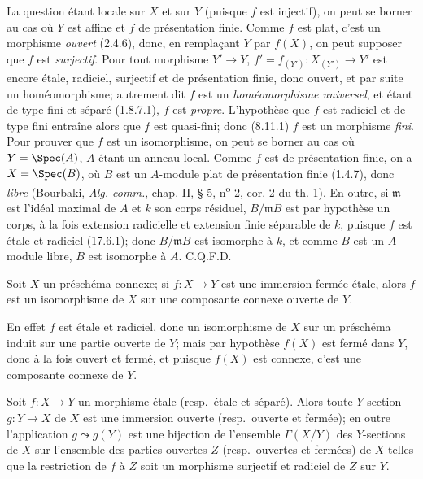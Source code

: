 La question étant locale sur $X$ et sur $Y$ (puisque $f$ est injectif), on peut se borner au cas où $Y$ est affine et $f$ de présentation finie. Comme $f$ est plat, c'est un morphisme \emph{ouvert} (2.4.6), donc, en remplaçant $Y$ par $f(X)$, on peut supposer que $f$ est \emph{surjectif}. Pour tout morphisme $Y'\to Y$, $f'=f_{(Y')}:X_{(Y')}\to Y'$ est encore étale, radiciel, surjectif et de présentation finie, donc ouvert, et par suite un homéomorphisme; autrement dit $f$ est un \emph{homéomorphisme universel}, et étant de type fini et séparé (1.8.7.1), $f$ est \emph{propre}. L'hypothèse que $f$ est radiciel et de type fini entraîne alors que $f$ est quasi-fini; donc (8.11.1) $f$ est un morphisme \emph{fini}. Pour prouver que $f$ est un isomorphisme, on peut se borner au cas
où $Y=\Spec(A)$, $A$ étant un anneau local. Comme $f$ est de présentation finie, on a $X=\Spec(B)$, où $B$ est un $A$-module plat de présentation finie (1.4.7), donc \emph{libre} (Bourbaki, \emph{Alg. comm.}, chap. II, § 5, n\textsuperscript{o} 2, cor. 2 du th. 1). En outre, si $\mathfrak m$ est l'idéal maximal de $A$ et $k$ son corps résiduel, $B/\mathfrak mB$ est par hypothèse un corps, à la fois extension radicielle et extension finie séparable de $k$, puisque $f$ est étale et radiciel (17.6.1); donc $B/\mathfrak mB$ est isomorphe à $k$, et comme $B$ est un $A$-module libre, $B$ est isomorphe à $A$. C.Q.F.D.

\begin{corollary}[17.9.2]
\label{IV.17.9.2}
Soit $X$ un préschéma connexe; si $f:X\to Y$ est une immersion fermée étale, alors $f$ est un isomorphisme de $X$ sur une composante connexe ouverte de $Y$.
\end{corollary}

En effet $f$ est étale et radiciel, donc un isomorphisme de $X$ sur un préschéma induit sur une partie ouverte de $Y$; mais par hypothèse $f(X)$ est fermé dans $Y$, donc à la fois ouvert et fermé, et puisque $f(X)$ est connexe, c'est une composante connexe de $Y$.

\begin{corollary}[17.9.3]
\label{IV.17.9.3}
Soit $f:X\to Y$ un morphisme étale \textup{(resp.}\ étale et séparé\textup{)}. Alors toute $Y$-section $g:Y\to X$ de $X$ est une immersion ouverte \textup{(resp.}\ ouverte et fermée\textup{)}; en outre l'application $g\leadsto g(Y)$ est une bijection de l'ensemble $\Gamma(X/Y)$ des $Y$-sections de $X$ sur l'ensemble des parties ouvertes $Z$ \textup{(resp.}\ ouvertes et fermées\textup{)} de $X$ telles que la restriction de $f$ à $Z$ soit un morphisme surjectif et radiciel de $Z$ sur $Y$.
\end{corollary}

